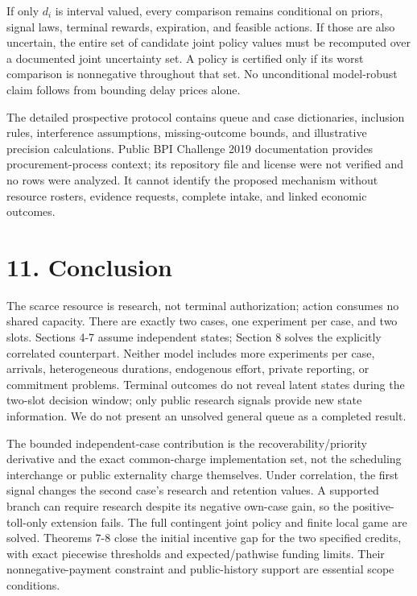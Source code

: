 \documentclass[
  11pt,
]{article}
\begin{document}
If only \(d_i\) is interval valued, every comparison remains conditional
on priors, signal laws, terminal rewards, expiration, and feasible
actions. If those are also uncertain, the entire set of candidate joint
policy values must be recomputed over a documented joint uncertainty
set. A policy is certified only if its worst comparison is nonnegative
throughout that set. No unconditional model-robust claim follows from
bounding delay prices alone.

The detailed prospective protocol contains queue and case dictionaries,
inclusion rules, interference assumptions, missing-outcome bounds, and
illustrative precision calculations. Public BPI Challenge 2019
documentation provides procurement-process context; its repository file
and license were not verified and no rows were analyzed. It cannot
identify the proposed mechanism without resource rosters, evidence
requests, complete intake, and linked economic outcomes.

\section{11. Conclusion}\label{limitations-and-conclusion}

The scarce resource is research, not terminal authorization; action
consumes no shared capacity. There are exactly two cases, one experiment
per case, and two slots. Sections 4-7 assume independent states; Section
8 solves the explicitly correlated counterpart. Neither model includes
more experiments per case, arrivals, heterogeneous durations, endogenous
effort, private reporting, or commitment problems. Terminal outcomes do
not reveal latent states during the two-slot decision window; only
public research signals provide new state information. We do not present
an unsolved general queue as a completed result.

The bounded independent-case contribution is the recoverability/priority
derivative and the exact common-charge implementation set, not the
scheduling interchange or public externality charge themselves. Under
correlation, the first signal changes the second case's research and
retention values. A supported branch can require research despite its
negative own-case gain, so the positive-toll-only extension fails. The
full contingent joint policy and finite local game are solved. Theorems
7-8 close the initial incentive gap for the two specified credits, with
exact piecewise thresholds and expected/pathwise funding limits. Their
nonnegative-payment constraint and public-history support are essential
scope conditions.
\end{document}
